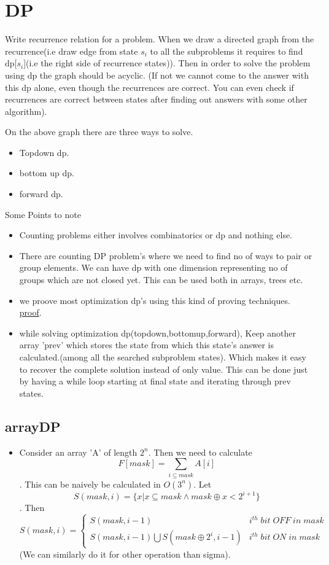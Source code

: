 \documentclass[../Notes.tex]{subfiles}
\begin{document}
\chapter{DP}

Write recurrence relation for a problem. When we draw a directed graph from the recurrence(i.e draw edge from state $s_i$ to all the subproblems it requires to find dp[$s_i$](i.e the right side of recurrence states)). Then in order to solve the problem using dp the graph should be acyclic. (If not we cannot come to the answer with this dp alone, even though the recurrences are correct. You can even check if recurrences are correct between states after finding out answers with some other algorithm).

On the above graph there are three ways to solve.
\begin{itemize}
	\item Topdown dp.
	\item bottom up dp.
	\item forward dp.
\end{itemize}	
Some Points to note
\begin{itemize}
	\item Counting problems either involves combinatorics or dp and nothing else.
	\item There are counting DP problem's where we need to find no of ways to pair or group elements. We can have dp with one dimension representing no of groups which are not closed yet. This can be used both in arrays, trees etc.  
	\item we proove most optimization dp's using this kind of proving techniques.
	\href{Material/dpproof.pdf}{proof}.\pagebreak
	\item while solving optimization dp(topdown,bottomup,forward), Keep another array 'prev' which stores the state from which this state's answer is calculated.(among all the searched subproblem states). Which makes it easy to recover the complete solution instead of only value. This can be done just by having a while loop starting at final state and iterating through prev states. 
\end{itemize}

\section{arrayDP}
\begin{itemize}
	\item Consider an array 'A' of length $2^n$. Then we need to calculate
	$$F[mask] = \sum_{i\subseteq mask}A[i]$$. This can be naively be calculated in $O(3^n)$.
	Let $$S(mask,i) = \{x|x\subseteq mask\wedge mask\oplus x < 2^{i+1}\}$$.
	Then \[ S(mask,i)=\begin{cases} 
      S(mask,i-1) & i^{th}\; bit\; OFF\; in\; mask  \\
      S(mask,i-1) \bigcup S(mask\oplus 2^i,i-1) & i^{th}\; bit\; ON\; in\; mask
   \end{cases}
\]
	(We can similarly do it for other operation than sigma).	 
	
\end{itemize}
\end{document}
